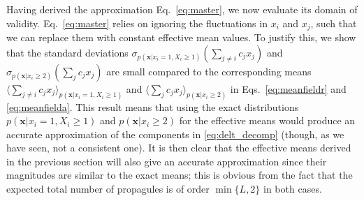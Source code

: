\documentclass[12pt]{article}
\begin{document}
Having derived the approximation Eq.~\eqref{eq:master}, we now evaluate its domain of validity. Eq.~\eqref{eq:master} relies on ignoring the fluctuations in $x_i$ and $x_j$, such that we can replace them with constant effective mean values. To justify this, we show that the standard deviations $\sigma_{p({\mathbf x}|x_i=1,X_i\geq 1)}(\sum_{j\neq i} c_j x_j)$ and $\sigma_{p({\mathbf x}|x_i\geq 2)}(\sum_j c_j x_j)$ are small compared to the corresponding means $\langle\sum_{j\neq i} c_j x_j\rangle_{p({\mathbf x}|x_i=1,X_i\geq 1)}$ and $\langle\sum_j c_j x_j\rangle_{p({\mathbf x}|x_i\geq 2)}$ in Eqs.~\eqref{eq:meanfieldr} and \eqref{eq:meanfielda}. This result means that using the exact distributions $p({\mathbf x}|x_i=1,X_i\geq 1)$ and $p({\mathbf x}|x_i\geq 2)$ for the effective means would produce an accurate approximation of the components in \eqref{eq:delt_decomp} (though, as we have seen, not a consistent one). It is then clear that the effective means derived in the previous section will also give an accurate approximation since their magnitudes are similar to the exact means; this is obvious from the fact that the expected total number of propagules is of order $\min\{L,2\}$ in both cases.
\end{document}
